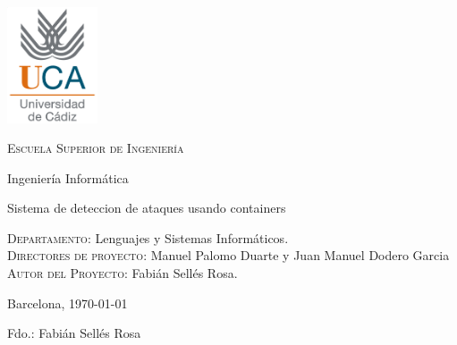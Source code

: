 \thispagestyle{empty}

\includegraphics[width=0.2\textwidth]{images/logouca}

\bigskip
\bigskip
\bigskip
  
  \begin{changemargin}{3em}{3em}

    \begin{center}
      {\Huge \textsc{\nohyphens{Escuela Superior de Ingeniería}}}
      
      \bigskip
      \bigskip
      
      {\huge \nohyphens{Ingeniería Informática}}
      
      \bigskip
      \bigskip
      \bigskip
      \bigskip
      
      {\LARGE \nohyphens{Sistema de deteccion de ataques usando containers}}
      
      \bigskip
      \bigskip
      \bigskip
      \bigskip
      
    \end{center}
  \end{changemargin}

  \begin{flushleft}
    \Large

    \textsc{Departamento}: \nohyphens{Lenguajes y Sistemas Informáticos.} \\
    \textsc{Directores de proyecto}: \nohyphens{Manuel Palomo Duarte y Juan Manuel Dodero Garcia} \\
    \textsc{Autor del Proyecto}: \nohyphens{Fabián Sellés Rosa}. \\
  \end{flushleft}
  
  \bigskip
  \bigskip
  \bigskip
  
  \begin{flushright}
    \large
    Barcelona, \today
    
    Fdo.: Fabián Sellés Rosa
    
  \end{flushright}

